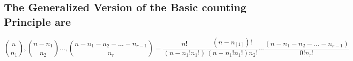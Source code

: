 \documentclass{article}
\begin{document}
\subsection*{The Generalized Version of the Basic counting Principle are}
\begin{equation}
    \binom{n}{n_{1}}, \binom{n-n_{1}}{n_{2}}\ldots,\binom{n-n_{1}-n_{2}- \ldots -n_{r-1}}{n_{r}} = \frac{n!}{(n-n_{1}!n_{1}!)} \frac{(n-n_[1])!}{(n-n_{1}!n_{1}!)n_{2}!} \ldots \frac{(n-n_{1}-n_{2}- \ldots - n_{r-1})}{0! n_{r}!} 
\end{equation}
\end{document}
